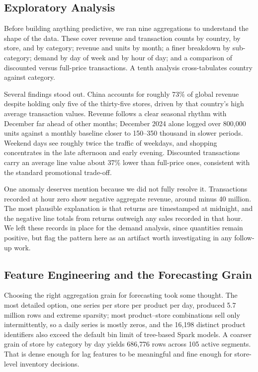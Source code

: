 \documentclass[11pt,a4paper]{article}
\begin{document}
\subsection{Exploratory Analysis}

Before building anything predictive, we ran nine aggregations to understand the shape of the data. These cover revenue and transaction counts by country, by store, and by category; revenue and units by month; a finer breakdown by sub-category; demand by day of week and by hour of day; and a comparison of discounted versus full-price transactions. A tenth analysis cross-tabulates country against category.

Several findings stood out. China accounts for roughly 73\% of global revenue despite holding only five of the thirty-five stores, driven by that country's high average transaction values. Revenue follows a clear seasonal rhythm with December far ahead of other months; December 2024 alone logged over 800{,}000 units against a monthly baseline closer to 150--350 thousand in slower periods. Weekend days see roughly twice the traffic of weekdays, and shopping concentrates in the late afternoon and early evening. Discounted transactions carry an average line value about 37\% lower than full-price ones, consistent with the standard promotional trade-off.

One anomaly deserves mention because we did not fully resolve it. Transactions recorded at hour zero show negative aggregate revenue, around minus 40 million. The most plausible explanation is that returns are timestamped at midnight, and the negative line totals from returns outweigh any sales recorded in that hour. We left these records in place for the demand analysis, since quantities remain positive, but flag the pattern here as an artifact worth investigating in any follow-up work.

\subsection{Feature Engineering and the Forecasting Grain}\label{sec:grain}

Choosing the right aggregation grain for forecasting took some thought. The most detailed option, one series per store per product per day, produced 5.7 million rows and extreme sparsity; most product--store combinations sell only intermittently, so a daily series is mostly zeros, and the 16{,}198 distinct product identifiers also exceed the default bin limit of tree-based Spark models. A coarser grain of store by category by day yields 686{,}776 rows across 105 active segments. That is dense enough for lag features to be meaningful and fine enough for store-level inventory decisions.
\end{document}
